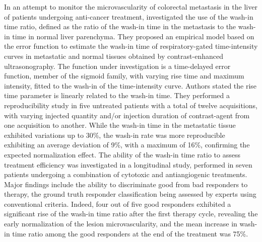 In an attempt to monitor the microvascularity of colorectal metastasis in the liver of patients undergoing anti-cancer treatment, \citet{Averkiou:2010iw} investigated the use of the wash-in time ratio, defined as the ratio of the wash-in time in the metastasis to the wash-in time in normal liver parenchyma.
They proposed an empirical model based on the error function to estimate the wash-in time of respiratory-gated time-intensity curves in metastatic and normal tissues obtained by contrast-enhanced ultrasonography.
The function under investigation is a time-delayed error function, member of the sigmoid family, with varying rise time and maximum intensity, fitted to the wash-in of the time-intensity curve.
Authors stated the rise time parameter is linearly related to the wash-in time.
They performed a reproducibility study in five untreated patients with a total of twelve acquisitions, with varying injected quantity and/or injection duration of contrast-agent from one acquisition to another.
While the wash-in time in the metastatic tissue exhibited variations up to 30\%, the wash-in rate was more reproducible exhibiting an average deviation of 9\%, with a maximum of 16\%, confirming the expected normalization effect.
The ability of the wash-in time ratio to assess treatment efficiency was investigated in a longitudinal study, performed in seven patients undergoing a combination of cytotoxic and antiangiogenic treatments.
Major findings include the ability to discriminate good from bad responders to therapy, the ground truth responder classification being assessed by experts using conventional criteria.
Indeed, four out of five good responders exhibited a significant rise of the wash-in time ratio after the first therapy cycle, revealing the early normalization of the lesion microvascularity, and the mean increase in wash-in time ratio among the good responders at the end of the treatment was 75\%.


